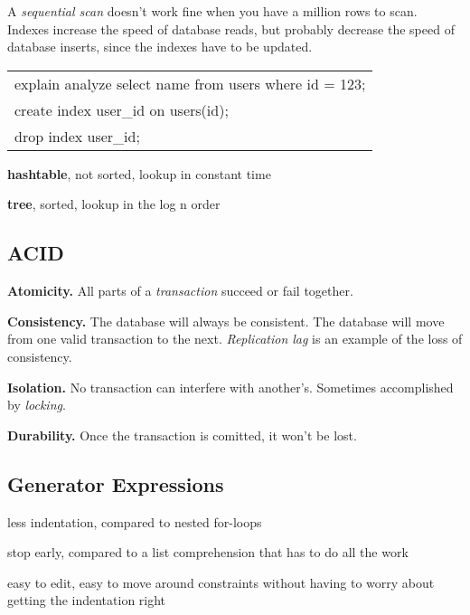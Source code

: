 \documentclass[12pt]{article}
\begin{document}
A \emph{sequential scan} doesn't work fine when you have a million rows to scan. Indexes increase the speed of database reads, but probably decrease the speed of database inserts, since the indexes have to be updated.

\begin{tabular}{l}
explain analyze select name from users where id = 123; \\
create index user\_id on users(id); \\
drop index user\_id;
\end{tabular}

\textbf{hashtable}, not sorted, lookup in constant time

\textbf{tree}, sorted, lookup in the log n order



\subsection{ACID}

\textbf{Atomicity.} All parts of a \emph{transaction} succeed or fail together.

\textbf{Consistency.} The database will always be consistent. The database will move from one valid transaction to the next. \emph{Replication lag} is an example of the loss of consistency.

\textbf{Isolation.} No transaction can interfere with another's. Sometimes accomplished by \emph{locking}.

\textbf{Durability.} Once the transaction is comitted, it won't be lost.



\subsection{Generator Expressions}

\begin{list}{*}{
\setlength{\itemsep}{0pt}
\setlength{\parsep}{0pt}
\setlength{\topsep}{0pt}
\setlength{\partopsep}{0pt}
\setlength{\leftmargin}{2em}
\setlength{\labelwidth}{1.5em}
\setlength{\labelsep}{0.5em}
}
\item less indentation, compared to nested for-loops
\item stop early, compared to a list comprehension that has to do all the work
\item easy to edit, easy to move around constraints without having to worry about getting the indentation right
\end{list}
\end{document}
